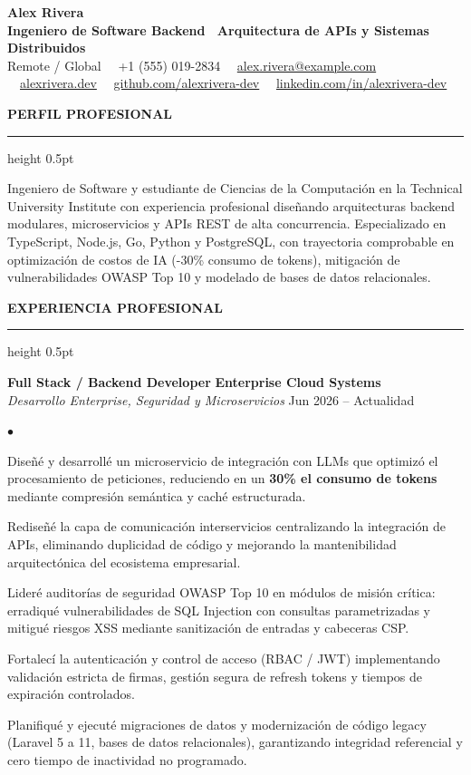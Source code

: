 \documentclass[10pt,letterpaper]{article}
\newcommand{\resumesection}[1]{%
  \vspace{2pt}%
  {\color{primary}\normalsize\bfseries\MakeUppercase{#1}}%
  \vspace{1pt}\hrule height 0.5pt\vspace{2pt}%
}
\renewenvironment{itemize}{%
  \begin{list}{\color{primary}$\bullet$}{%
    \setlength{\leftmargin}{1.1em}%
    \setlength{\itemsep}{0.5pt}%
    \setlength{\topsep}{1pt}%
    \setlength{\parsep}{0pt}%
    \setlength{\partopsep}{0pt}%
  }%
}{%
  \end{list}%
}
\begin{document}
\color{textdark}

\begin{center}
    {\LARGE \textbf{\color{primary} Alex Rivera}} \\ \vspace{1.5pt}
    {\large \textbf{Ingeniero de Software Backend \textbar\ Arquitectura de APIs y Sistemas Distribuidos}} \\ \vspace{2pt}
    {\small
        Remote / Global \ \textbullet \
        +1 (555) 019-2834 \ \textbullet \
        \href{mailto:alex.rivera@example.com}{alex.rivera@example.com} \ \textbullet \
        \href{https://alexrivera.dev}{alexrivera.dev} \ \textbullet \
        \href{https://github.com/alexrivera-dev}{github.com/alexrivera-dev} \ \textbullet \
        \href{https://linkedin.com/in/alexrivera-dev}{linkedin.com/in/alexrivera-dev}
    }
\end{center}

\vspace{-6pt}

\resumesection{Perfil Profesional}
{\small Ingeniero de Software y estudiante de Ciencias de la Computación en la Technical University Institute con experiencia profesional diseñando arquitecturas backend modulares, microservicios y APIs REST de alta concurrencia. Especializado en TypeScript, Node.js, Go, Python y PostgreSQL, con trayectoria comprobable en optimización de costos de IA (-30\% consumo de tokens), mitigación de vulnerabilidades OWASP Top 10 y modelado de bases de datos relacionales.}

\resumesection{Experiencia Profesional}

\textbf{Full Stack / Backend Developer} \hfill \textbf{Enterprise Cloud Systems} \\
\textit{Desarrollo Enterprise, Seguridad y Microservicios} \hfill Jun 2026 -- Actualidad
\begin{itemize}
    \item Diseñé y desarrollé un microservicio de integración con LLMs que optimizó el procesamiento de peticiones, reduciendo en un \textbf{30\% el consumo de tokens} mediante compresión semántica y caché estructurada.
    \item Rediseñé la capa de comunicación interservicios centralizando la integración de APIs, eliminando duplicidad de código y mejorando la mantenibilidad arquitectónica del ecosistema empresarial.
    \item Lideré auditorías de seguridad OWASP Top 10 en módulos de misión crítica: erradiqué vulnerabilidades de SQL Injection con consultas parametrizadas y mitigué riesgos XSS mediante sanitización de entradas y cabeceras CSP.
    \item Fortalecí la autenticación y control de acceso (RBAC / JWT) implementando validación estricta de firmas, gestión segura de refresh tokens y tiempos de expiración controlados.
    \item Planifiqué y ejecuté migraciones de datos y modernización de código legacy (Laravel 5 a 11, bases de datos relacionales), garantizando integridad referencial y cero tiempo de inactividad no programado.
\end{itemize}
\end{document}

